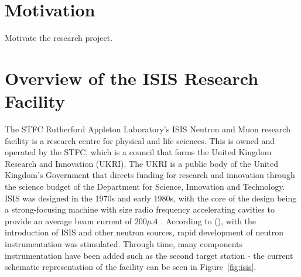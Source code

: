 \documentclass[10pt,oneside]{report}
\begin{document}
\textbf{ }


\section{Motivation}
Motivate the research project.




\section{Overview of the ISIS Research Facility}


The STFC Rutherford Appleton Laboratory's ISIS Neutron and Muon research facility is a research centre for physical and life sciences. This is owned and operated by the STFC, which is a council that forms the United Kingdom Research and Innovation (UKRI). The UKRI is a public body of the United Kingdom's Government that directs funding for research and innovation through the science budget of the Department for Science, Innovation and Technology. ISIS was designed in the 1970s and early 1980s, with the core of the design being a strong-focusing machine with size radio frequency accelerating cavities to provide an average beam current of $200\mu A$ \cite{thomason2019isis}. According to (\cite{thomason2019isis}), with the introduction of ISIS and other neutron sources, rapid development of neutron instrumentation was stimulated. Through time, many components instrumentation have been added such as the second target station - the current schematic representation of the facility can be seen in Figure~\ref{fig:isis}.
\end{document}
